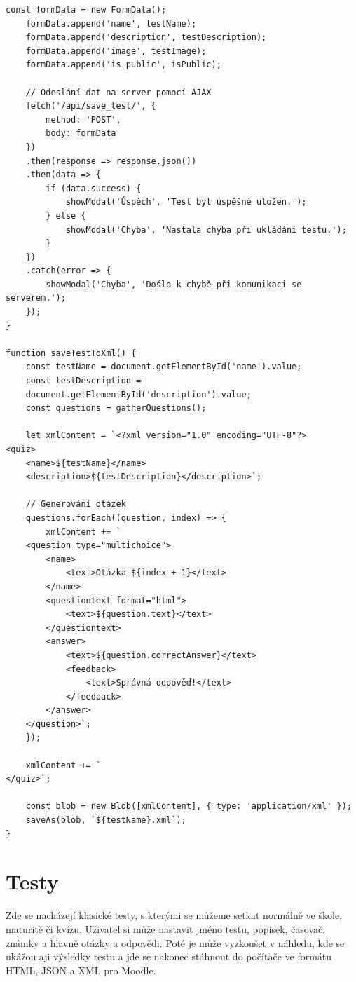 \documentclass[12pt, a4paper, twoside, openright]{report}
\begin{document}
\begin{lstlisting}[style=Javascript]
    const formData = new FormData();
    formData.append('name', testName);
    formData.append('description', testDescription);
    formData.append('image', testImage);
    formData.append('is_public', isPublic);

    // Odeslání dat na server pomocí AJAX
    fetch('/api/save_test/', {
        method: 'POST',
        body: formData
    })
    .then(response => response.json())
    .then(data => {
        if (data.success) {
            showModal('Úspěch', 'Test byl úspěšně uložen.');
        } else {
            showModal('Chyba', 'Nastala chyba při ukládání testu.');
        }
    })
    .catch(error => {
        showModal('Chyba', 'Došlo k chybě při komunikaci se serverem.');
    });
}

function saveTestToXml() {
    const testName = document.getElementById('name').value;
    const testDescription = 
    document.getElementById('description').value; 
    const questions = gatherQuestions();

    let xmlContent = `<?xml version="1.0" encoding="UTF-8"?>
<quiz>
    <name>${testName}</name>
    <description>${testDescription}</description>`;

    // Generování otázek
    questions.forEach((question, index) => {
        xmlContent += `
    <question type="multichoice">
        <name>
            <text>Otázka ${index + 1}</text>
        </name>
        <questiontext format="html">
            <text>${question.text}</text>
        </questiontext>
        <answer>
            <text>${question.correctAnswer}</text>
            <feedback>
                <text>Správná odpověď!</text>
            </feedback>
        </answer>
    </question>`;
    });

    xmlContent += `
</quiz>`;

    const blob = new Blob([xmlContent], { type: 'application/xml' });
    saveAs(blob, `${testName}.xml`);
}
	\end{lstlisting}

	
    \chapter{Testy}
    Zde se nacházejí klasické testy, s kterými se můžeme setkat normálně ve škole, maturitě či kvízu. Uživatel si může nastavit jméno testu, popisek, časovač, známky a hlavně otázky a odpovědi. Poté je může vyzkoušet v náhledu, kde se ukážou aji výsledky testu a jde se nakonec stáhnout do počítače ve formátu HTML, JSON a XML pro Moodle.
\end{document}
